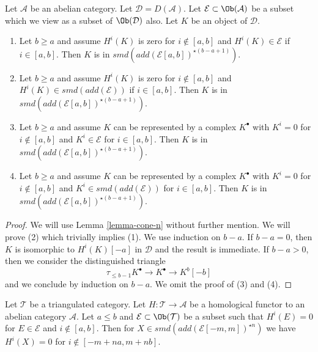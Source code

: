 \begin{lemma}
\label{lemma-in-cone-n}
Let $\mathcal{A}$ be an abelian category. Let $\mathcal{D} = D(\mathcal{A})$.
Let $\mathcal{E} \subset \Ob(\mathcal{A})$ be a subset which we view as
a subset of $\Ob(\mathcal{D})$ also. Let $K$ be an object of $\mathcal{D}$.
\begin{enumerate}
\item Let $b \geq a$ and assume $H^i(K)$ is zero for $i \not \in [a, b]$
and $H^i(K) \in \mathcal{E}$ if $i \in [a, b]$. Then $K$ is in
$smd(add(\mathcal{E}[a, b])^{\star (b - a + 1)})$.
\item Let $b \geq a$ and assume $H^i(K)$ is zero for $i \not \in [a, b]$
and $H^i(K) \in smd(add(\mathcal{E}))$ if $i \in [a, b]$. Then $K$ is in
$smd(add(\mathcal{E}[a, b])^{\star (b - a + 1)})$.
\item Let $b \geq a$ and assume $K$ can be represented by a complex $K^\bullet$
with $K^i = 0$ for $i \not \in [a, b]$ and $K^i \in \mathcal{E}$ for
$i \in [a, b]$. Then $K$ is in
$smd(add(\mathcal{E}[a, b])^{\star (b - a + 1)})$.
\item Let $b \geq a$ and assume $K$ can be represented by a complex $K^\bullet$
with $K^i = 0$ for $i \not \in [a, b]$ and $K^i \in smd(add(\mathcal{E}))$ for
$i \in [a, b]$. Then $K$ is in
$smd(add(\mathcal{E}[a, b])^{\star (b - a + 1)})$.
\end{enumerate}
\end{lemma}

\begin{proof}
We will use Lemma \ref{lemma-cone-n} without further mention.
We will prove (2) which trivially implies (1). We use induction
on $b - a$. If $b - a = 0$, then $K$ is isomorphic to $H^i(K)[-a]$
in $\mathcal{D}$ and the result is immediate. If $b - a > 0$, then
we consider the distinguished triangle
$$
\tau_{\leq b - 1}K^\bullet \to K^\bullet \to K^b[-b]
$$
and we conclude by induction on $b - a$. We omit the proof of (3) and (4).
\end{proof}

\begin{lemma}
\label{lemma-forward-cone-n}
Let $\mathcal{T}$ be a triangulated category. Let
$H : \mathcal{T} \to \mathcal{A}$ be a homological functor
to an abelian category $\mathcal{A}$.
Let $a \leq b$ and $\mathcal{E} \subset \Ob(\mathcal{T})$
be a subset such that $H^i(E) = 0$ for $E \in \mathcal{E}$
and $i \not \in [a, b]$.
Then for $X \in smd(add(\mathcal{E}[-m, m])^{\star n})$
we have $H^i(X) = 0$ for $i \not \in [-m + na, m + nb]$.
\end{lemma}

